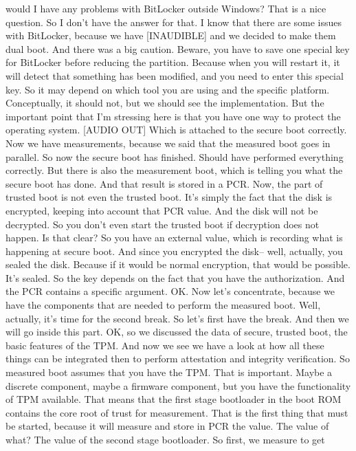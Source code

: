  would I have any problems with BitLocker outside Windows? That is a nice
 question. So I don't have the answer for that. I know that there are some
 issues with BitLocker, because we have [INAUDIBLE] and we decided to make them
 dual boot. And there was a big caution. Beware, you have to save one special
 key for BitLocker before reducing the partition. Because when you will restart
 it, it will detect that something has been modified, and you need to enter
 this special key. So it may depend on which tool you are using and the
 specific platform. Conceptually, it should not, but we should see the
 implementation. But the important point that I'm stressing here is that you
 have one way to protect the operating system. [AUDIO OUT] Which is attached to
 the secure boot correctly. Now we have measurements, because we said that the
 measured boot goes in parallel. So now the secure boot has finished. Should
 have performed everything correctly. But there is also the measurement boot,
 which is telling you what the secure boot has done. And that result is stored
 in a PCR. Now, the part of trusted boot is not even the trusted boot. It's
 simply the fact that the disk is encrypted, keeping into account that PCR
 value. And the disk will not be decrypted. So you don't even start the trusted
 boot if decryption does not happen. Is that clear? So you have an external
 value, which is recording what is happening at secure boot. And since you
 encrypted the disk-- well, actually, you sealed the disk. Because if it would
 be normal encryption, that would be possible. It's sealed. So the key depends
 on the fact that you have the authorization. And the PCR contains a specific
 argument. OK. Now let's concentrate, because we have the components that are
 needed to perform the measured boot. Well, actually, it's time for the second
 break. So let's first have the break. And then we will go inside this part.
 OK, so we discussed the data of secure, trusted boot, the basic features of
 the TPM. And now we see we have a look at how all these things can be
 integrated then to perform attestation and integrity verification. So measured
 boot assumes that you have the TPM. That is important. Maybe a discrete
 component, maybe a firmware component, but you have the functionality of TPM
 available. That means that the first stage bootloader in the boot ROM contains
 the core root of trust for measurement. That is the first thing that must be
 started, because it will measure and store in PCR the value. The value of
 what? The value of the second stage bootloader. So first, we measure to get
